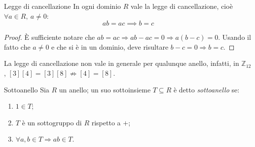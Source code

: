 \documentclass[11pt, a4paper]{scrartcl}
\theoremstyle{definition}
\numberwithin{esempio}{section}
\theoremstyle{definition}
\numberwithin{obs}{section}
\numberwithin{nota}{section}
\numberwithin{equation}{subsection}
\begin{document}
\begin{prop}
	{Legge di cancellazione}{}
	In ogni dominio $R$ vale la legge di cancellazione, cio\`e $\forall a \in R ,\ a \neq 0$:
	\[
	a b = ac \implies b = c
	\] 
	\begin{proof}
		\`E sufficiente notare che $ab = ac \Rightarrow  a b - a c = 0 \Rightarrow a ( b- c) = 0$. 
		Usando il fatto che $a\neq 0$ e che si \`e in un dominio, deve risultare $b- c = 0 \Rightarrow  b = c$.
	\end{proof}
\end{prop}
\noindent La legge di cancellazione non vale in generale per qualunque anello, infatti, in $\mathbb{Z}_{12} $, $[3][4] = [3][8] \not\Rightarrow  [4] = [8]$.
\begin{definizione}
	{Sottoanello}{}
	Sia $R$ un anello; un suo sottoinsieme $T \subseteq R$ \`e detto \textit{sottoanello} se:
	\begin{enumerate}[(sr 1).]
		\item $1\in T$;
		\item $T$ \`e un sottogruppo di $R$ rispetto a $+$;
		\item $\forall a,b \in T \Rightarrow ab \in T$.
	\end{enumerate}
\end{definizione}
\end{document}
